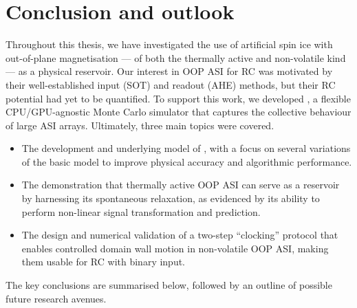 \chapter{Conclusion and outlook}\label{ch:Conclusion}

Throughout this thesis, we have investigated the use of artificial spin ice with out-of-plane magnetisation --- of both the thermally active and non-volatile kind --- as a physical reservoir.
Our interest in OOP ASI for RC was motivated by their well-established input (SOT) and readout (AHE) methods, but their RC potential had yet to be quantified.
To support this work, we developed \hotspice, a flexible CPU/GPU-agnostic Monte Carlo simulator that captures the collective behaviour of large ASI arrays.
Ultimately, three main topics were covered.
\begin{itemize}
	\item The development and underlying model of \hotspice{}, with a focus on several variations of the basic model to improve physical accuracy and algorithmic performance.
	\item The demonstration that thermally active OOP ASI can serve as a reservoir by harnessing its spontaneous relaxation, as evidenced by its ability to perform non-linear signal transformation and prediction.
	\item The design and numerical validation of a two-step ``clocking'' protocol that enables controlled domain wall motion in non-volatile OOP ASI, making them usable for RC with binary input.
\end{itemize}
The key conclusions are summarised below, followed by an outline of possible future research avenues.

\newpage

